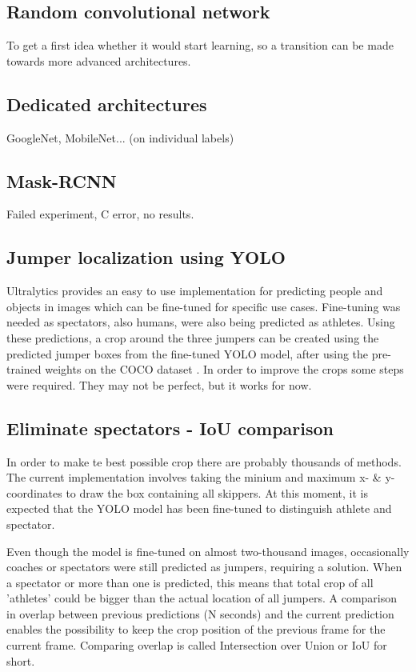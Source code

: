 \subsection{Random convolutional network}
To get a first idea whether it would start learning, so a transition can be made towards more advanced architectures.

\subsection{Dedicated architectures}
GoogleNet, MobileNet... (on individual labels)

\subsection{Mask-RCNN}
Failed experiment, C error, no results.

\subsection{Jumper localization using YOLO}

Ultralytics \autocite{Khanam2024} provides an easy to use implementation for predicting people and objects in images which can be fine-tuned for specific use cases. Fine-tuning was needed as spectators, also humans, were also being predicted as athletes. Using these predictions, a crop around the three jumpers can be created using the predicted jumper boxes from the fine-tuned YOLO model, after using the pre-trained weights on the COCO dataset \autocite{Lin2014}. In order to improve the crops some steps were required. They may not be perfect, but it works for now.

\subsection{Eliminate spectators - IoU comparison}

In order to make te best possible crop there are probably thousands of methods. The current implementation involves taking the minium and maximum x- \& y-coordinates to draw the box containing all skippers.
At this moment, it is expected that the YOLO model has been fine-tuned to distinguish athlete and spectator.

Even though the model is fine-tuned on almost two-thousand images, occasionally coaches or spectators were still predicted as jumpers, requiring a solution.
When a spectator or more than one is predicted, this means that total crop of all 'athletes' could be bigger than the actual location of all jumpers. A comparison in overlap between previous predictions (N seconds) and the current prediction enables the possibility to keep the crop position of the previous frame for the current frame. Comparing overlap is called Intersection over Union or IoU for short.

